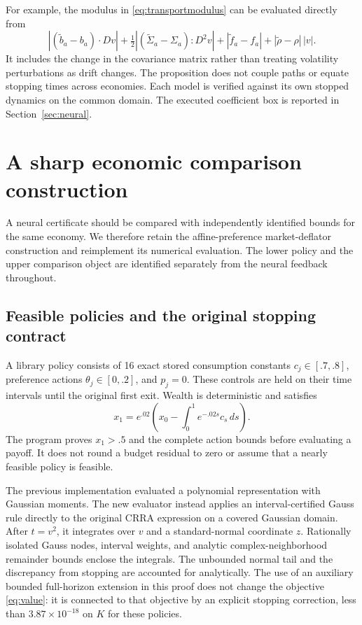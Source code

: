 For example, the modulus in \eqref{eq:transportmodulus} can be evaluated directly from
\[
 |(\widetilde b_a-b_a)\cdot Dv|
 +\tfrac12|(\widetilde\Sigma_a-\Sigma_a):D^2v|
 +|\widetilde f_a-f_a|+|\widetilde\rho-\rho|\,|v|.
\]
It includes the change in the covariance matrix rather than treating volatility perturbations as drift changes. The proposition does not couple paths or equate stopping times across economies. Each model is verified against its own stopped dynamics on the common domain. The executed coefficient box is reported in Section~\ref{sec:neural}.

\section{A sharp economic comparison construction}\label{sec:dual}
A neural certificate should be compared with independently identified bounds for the same economy. We therefore retain the affine-preference market-deflator construction and reimplement its numerical evaluation. The lower policy and the upper comparison object are identified separately from the neural feedback throughout.

\subsection{Feasible policies and the original stopping contract}
A library policy consists of 16 exact stored consumption constants $c_j\in[.7,.8]$, preference actions $\theta_j\in[0,.2]$, and $p_j=0$. These controls are held on their time intervals until the original first exit. Wealth is deterministic and satisfies
\[
 x_1=e^{.02}\left(x_0-\int_0^1e^{-.02s}c_s\,ds\right).
\]
The program proves $x_1>.5$ and the complete action bounds before evaluating a payoff. It does not round a budget residual to zero or assume that a nearly feasible policy is feasible.

The previous implementation evaluated a polynomial representation with Gaussian moments. The new evaluator instead applies an interval-certified Gauss rule directly to the original CRRA expression on a covered Gaussian domain. After $t=v^2$, it integrates over $v$ and a standard-normal coordinate $z$. Rationally isolated Gauss nodes, interval weights, and analytic complex-neighborhood remainder bounds enclose the integrals. The unbounded normal tail and the discrepancy from stopping are accounted for analytically. The use of an auxiliary bounded full-horizon extension in this proof does not change the objective \eqref{eq:value}: it is connected to that objective by an explicit stopping correction, less than $3.87\times10^{-18}$ on $K$ for these policies.

